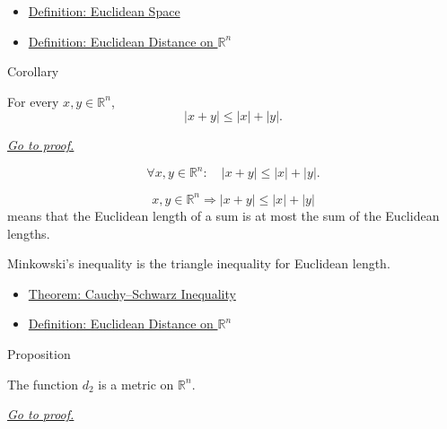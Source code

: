 \begin{dependencies}
\begin{itemize}
  \item \hyperref[def:euclidean-space]{Definition: Euclidean Space}
  \item \hyperref[def:euclidean-distance-rn]{Definition: Euclidean Distance on \(\mathbb{R}^n\)}
\end{itemize}
\end{dependencies}

\begin{corollarybox}{Corollary}
\begin{corollary}\label{cor:minkowski-inequality-rn}
For every \(x,y\in\mathbb{R}^n\),
\[
  |x+y|\leq |x|+|y|.
\]

\smallskip
\noindent
\hyperref[prf:minkowski-inequality-rn]{\textit{Go to proof.}}
\end{corollary}
\end{corollarybox}

\begin{remark*}
\[
\forall x,y\in\mathbb{R}^n{:}\quad |x+y|\leq |x|+|y|.
\]
\end{remark*}

\begin{remark*}
\[
x,y\in\mathbb{R}^n
\Longrightarrow
|x+y|\leq |x|+|y|
\]
means that the Euclidean length of a sum is at most the sum of the Euclidean
lengths.
\end{remark*}

\begin{remark*}[Interpretation]
Minkowski's inequality is the triangle inequality for Euclidean length.
\end{remark*}

\begin{dependencies}
\begin{itemize}
  \item \hyperref[thm:cauchy-schwarz-inequality]{Theorem: Cauchy--Schwarz Inequality}
  \item \hyperref[def:euclidean-distance-rn]{Definition: Euclidean Distance on \(\mathbb{R}^n\)}
\end{itemize}
\end{dependencies}

\begin{propositionbox}{Proposition}
\begin{proposition}
\label{prop:euclidean-distance-rn-metric}
The function \(d_2\) is a metric on \(\mathbb{R}^n\).

\smallskip
\noindent
\hyperref[prf:euclidean-distance-rn-metric]{\textit{Go to proof.}}
\end{proposition}
\end{propositionbox}

